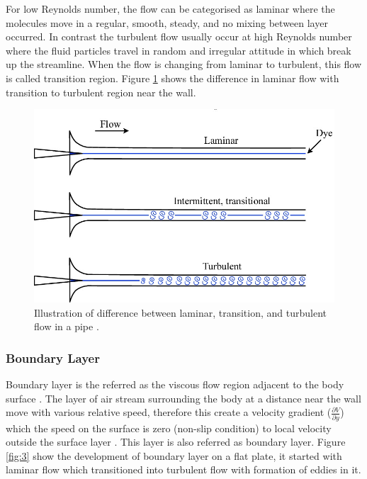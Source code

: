 \noindent For low Reynolds number, the flow can be categorised as laminar where the molecules move in a regular, smooth, steady, and no mixing between layer occurred\cite{Obidi2014TheoryVehicles}. In contrast the turbulent flow usually occur at high Reynolds number where the fluid particles travel in random and irregular attitude in which break up the streamline. When the flow is changing from laminar to turbulent, this flow is called transition region. Figure \ref{fig:2} shows the difference in laminar flow with transition to turbulent region near the wall. 

\begin{figure}[!ht]
    \centering
    \includegraphics[scale=0.3]{Figures/laminar_turbulent_difference.jpg}
    \caption{Illustration of difference between laminar, transition, and turbulent flow in a pipe \cite{D.BARKLE2016TheoreticalPipe}.}
    \label{fig:2}
\end{figure}

\subsubsection{Boundary Layer}
Boundary layer is the referred as the viscous flow region adjacent to the body surface \cite{Anderson2007FundamentalsJr.}. The layer of air stream surrounding the body at a distance near the wall move with various relative speed, therefore this create a velocity gradient ($\frac{\partial V}{\partial y}$) which the speed on the surface is zero (non-slip condition) to local velocity outside the surface layer \cite{Scibor-Rylski1984RoadAerodynamics}. This layer is also referred as boundary layer. Figure \ref{fig:3} show the development of boundary layer on a flat plate, it started with laminar flow which transitioned into turbulent flow with formation of eddies in it.

